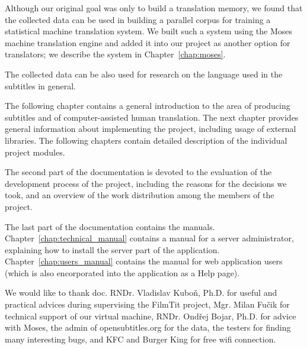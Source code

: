 Although our original goal was only to build a translation memory, we found that the collected data can be used in building a parallel corpus for training a statistical machine translation system. We built such a system using the Moses machine translation engine and added it into our project as another option for translators; we describe the system in Chapter~\ref{chap:moses}.

The collected data can be also used for research on the language used in the subtitles in general.

The following chapter contains a general introduction to the area of producing subtitles and of computer-assisted human translation. The next chapter provides general information about implementing the project, including usage of external libraries. The following chapters contain detailed description of the individual project modules.

The second part of the documentation is devoted to the evaluation of the development process of the project, including the reasons for the decisions we took, and an overview of the work distribution among the members of the project.

The last part of the documentation contains the manuals. Chapter~\ref{chap:technical_manual} contains a manual for a server administrator, explaining how to install the server part of the application. Chapter~\ref{chap:users_manual} contains the manual for web application users (which is also encorporated into the application as a Help page).

We would like to thank doc. RNDr. Vladislav Kuboň, Ph.D. for useful and practical
advices during supervising the FilmTit project, Mgr. Milan Fučik for technical
support of our virtual machine, RNDr. Ondřej Bojar, Ph.D. for advice with Moses,
the admin of opensubtitles.org for the data, the testers for finding many interesting bugs,
and KFC and Burger King for free wifi connection.
